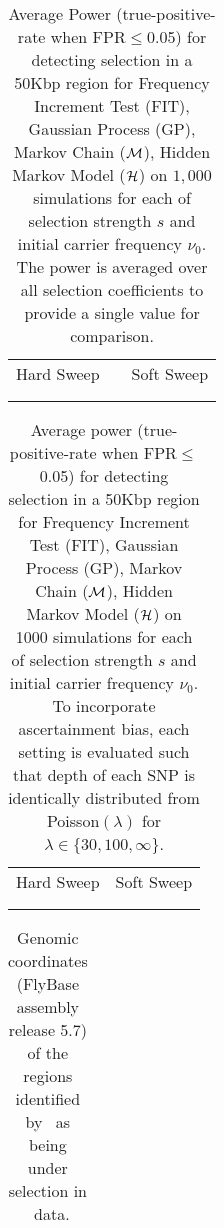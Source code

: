 \begin{table}[h]
	\centering
	\begin{tabular}{ccc}
		Hard Sweep & &Soft Sweep\\ \\  
		
		&&
	\end{tabular}
        \caption{Average Power (true-positive-rate when FPR$\le$0.05) for detecting selection in a 50Kbp region for Frequency Increment 
        Test (FIT), Gaussian Process (GP), Markov Chain (${\cal M}$), Hidden Markov 
        Model (${\cal H}$) on $1,000$ simulations for each of selection strength $s$ 
        and initial carrier frequency $\nu_0$. The power is averaged over all 
        selection coefficients to provide a single value for comparison.}
\label{tab:power}
\end{table}
\clearpage
\newpage
\begin{table}[H]
	\begin{tabular}{c||c}
		Hard Sweep & Soft Sweep\\ \\  
		
				&
	\end{tabular}
	\caption{Average power (true-positive-rate when FPR$\le$0.05) for 
          detecting selection in a 50Kbp region for Frequency Increment Test (FIT), 
          Gaussian Process (GP), Markov Chain (${\cal M}$), Hidden Markov Model (${\cal H}$) on 
          1000 
          simulations for each of selection strength $s$ and initial 
          carrier frequency $\nu_0$. To incorporate ascertainment bias, each 
          setting is evaluated such that depth of each SNP is identically 
          distributed from Poisson$(\lambda)$ for $\lambda \in 
          \{30,100,\infty\}$.}\label{tab:powerCLR}
\end{table}


\begin{table}[h]
	\centering
	\begin{tabular}{c}
		
	\end{tabular}
	\caption{Genomic coordinates (FlyBase assembly release 5.7) of the regions identified by \comale\ as being under selection in \data\ data.}\label{tab:intervals}
\end{table}